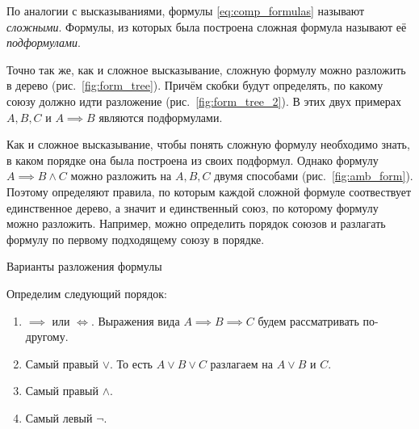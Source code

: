 По аналогии с высказываниями, формулы \eqref{eq:comp_formulas}
называют {\it сложными}.
Формулы, из которых была построена сложная формула
называют её {\it подформулами}.

Точно так же, как и сложное высказывание, сложную формулу можно
разложить в дерево (рис.~\ref{fig:form_tree}). Причём скобки будут
определять, по какому союзу должно идти разложение (рис.~\ref{fig:form_tree_2}).
В этих двух примерах $A,B,C$ и $A\implies B$ являются подформулами.

Как и сложное высказывание, чтобы понять сложную формулу
необходимо знать, в каком порядке она была построена из своих подформул.
Однако формулу $A\implies B\land C$ можно разложить на $A,B,C$ двумя
способами (рис.~\ref{fig:amb_form}).
Поэтому определяют правила, по которым каждой сложной формуле
соотвествует единственное дерево, а значит и единственный союз,
по которому формулу можно разложить.
Например, можно определить порядок союзов и разлагать формулу по первому
подходящему союзу в порядке.

\begin{marginfigure}[-2cm]
  \begin{multicols}{2}

  \end{multicols}

  \caption{Варианты разложения формулы}\label{fig:amb_form}
\end{marginfigure}

Определим следующий порядок:
\begin{enumerate}
  \item{}$\implies$ или $\iff$. Выражения вида ${A\implies B\implies C}$
  будем рассматривать по-другому.
  \item{}Самый правый $\lor$.
  То есть $A\lor B \lor C$ разлагаем на $A\lor B$ и $C$.
  \item{}Самый правый $\land$.
  \item{}Самый левый $\lnot$.
\end{enumerate}

